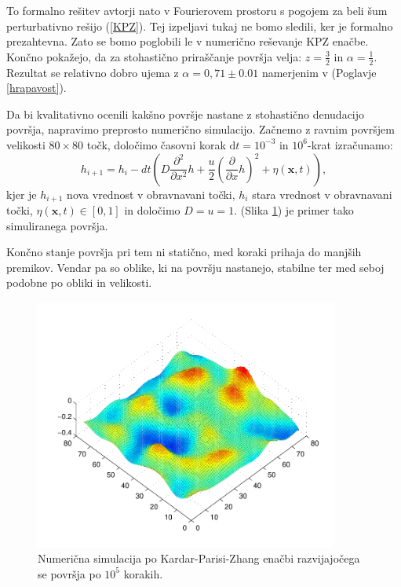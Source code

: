 \documentclass[a4paper, twoside, 12pt]{book}
\begin{document}
    To formalno rešitev avtorji \cite{kardar1986dynamic} nato v Fourierovem prostoru s pogojem za beli šum perturbativno rešijo (\ref{KPZ}). Tej izpeljavi tukaj ne bomo sledili, ker je formalno prezahtevna. Zato se bomo poglobili le v numerično reševanje KPZ enačbe. Končno pokažejo, da za stohastično priraščanje površja velja: $z = \frac{3}{2}$ in $\alpha=\frac{1}{2}$. Rezultat se relativno dobro ujema z $\alpha =  0,71 \pm 0.01$ namerjenim v (Poglavje \ref{hrapavost}).

Da bi kvalitativno ocenili kakšno površje nastane z stohastično denudacijo površja, napravimo preprosto numerično simulacijo. Začnemo z ravnim površjem velikosti $80\times80$ točk, določimo časovni korak $\mathrm{d}t=10^{-3}$ in $10^6$-krat izračunamo:
\begin{equation} 
  h_{i+1} = h_i - dt (D \frac{\partial^2}{\partial x^2} h + \frac{u}{2} (\frac{\partial}{\partial x} h)^2 + \eta (\mathbf{x},t)),
\end{equation}
kjer je $h_{i+1}$ nova vrednost v obravnavani točki, $h_{i}$ stara vrednost v obravnavani točki, $\eta (\mathbf{x},t) \in [0,1]$ in določimo $D = u = 1$. (Slika \ref{fig:KPZ-numericno}) je primer tako simuliranega površja.

Končno stanje površja pri tem ni statično, med koraki prihaja do manjših premikov. Vendar pa so oblike, ki na površju nastanejo, stabilne ter med seboj podobne po obliki in velikosti.

    \begin{figure}[h]
      \begin{center}
        \includegraphics[width=10cm]{slike/KPZ-numericno}
      \end{center}
      \caption{Numerična simulacija po Kardar-Parisi-Zhang enačbi razvijajočega se površja po $10^5$ korakih.}
      \label{fig:KPZ-numericno}
    \end{figure}
\end{document}
